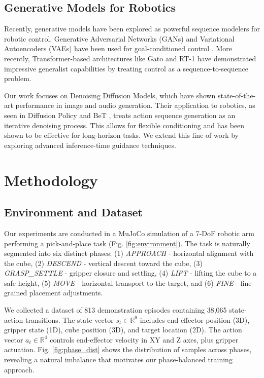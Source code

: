 \documentclass[conference]{IEEEtran}
\begin{document}
\subsection{Generative Models for Robotics}
Recently, generative models have been explored as powerful sequence modelers for robotic control. Generative Adversarial Networks (GANs) and Variational Autoencoders (VAEs) have been used for goal-conditioned control \cite{goal_gan}. More recently, Transformer-based architectures like Gato \cite{gato} and RT-1 \cite{rt1} have demonstrated impressive generalist capabilities by treating control as a sequence-to-sequence problem.

Our work focuses on Denoising Diffusion Models, which have shown state-of-the-art performance in image and audio generation. Their application to robotics, as seen in Diffusion Policy \cite{diffusion_policy} and BeT \cite{bet}, treats action sequence generation as an iterative denoising process. This allows for flexible conditioning and has been shown to be effective for long-horizon tasks. We extend this line of work by exploring advanced inference-time guidance techniques.

\section{Methodology}

\subsection{Environment and Dataset}
Our experiments are conducted in a MuJoCo simulation of a 7-DoF robotic arm performing a pick-and-place task (Fig. \ref{fig:environment}). The task is naturally segmented into six distinct phases: (1) \textit{APPROACH} - horizontal alignment with the cube, (2) \textit{DESCEND} - vertical descent toward the cube, (3) \textit{GRASP\_SETTLE} - gripper closure and settling, (4) \textit{LIFT} - lifting the cube to a safe height, (5) \textit{MOVE} - horizontal transport to the target, and (6) \textit{FINE} - fine-grained placement adjustments. 

We collected a dataset of 813 demonstration episodes containing 38,065 state-action transitions. The state vector $s_t \in \mathbb{R}^{9}$ includes end-effector position (3D), gripper state (1D), cube position (3D), and target location (2D). The action vector $a_t \in \mathbb{R}^4$ controls end-effector velocity in XY and Z axes, plus gripper actuation. Fig. \ref{fig:phase_dist} shows the distribution of samples across phases, revealing a natural imbalance that motivates our phase-balanced training approach.
\end{document}
